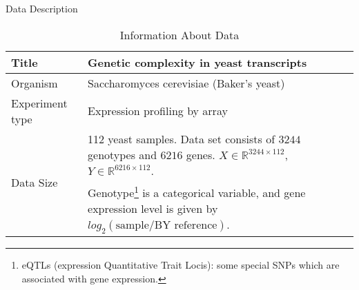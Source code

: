 \begin{frame}{Data Description}
\begin{table}[h]
        \centering

        \begin{tabular}{|l|p{7cm}|}
            \hline
            Title                           &   Genetic complexity in yeast transcripts \\ \hline
            Organism                        &   Saccharomyces cerevisiae (Baker's yeast)\\ \hline
            Experiment type                 &   Expression profiling by array           \\ \hline
            \multirow{3}{*}{Data Size}      &   112 yeast samples. Data set consists of $3244$ genotypes and $6216$ genes.  $X \in \mathbb{R}^{3244\times112}$, $Y \in \mathbb{R}^{6216\times112}$. \\ \hline
           \multirow{3}{*}{Description}     &   Genotype\footnote[1]{eQTLs (expression Quantitative Trait Locis): some special SNPs which are associated with gene expression. } is a categorical variable, and gene expression level is given by  $log_2(\text{sample} / \text{BY reference})$. \\ \hline
        \end{tabular}
        \caption{Information About Data}
    \end{table}
\end{frame}

    

      

